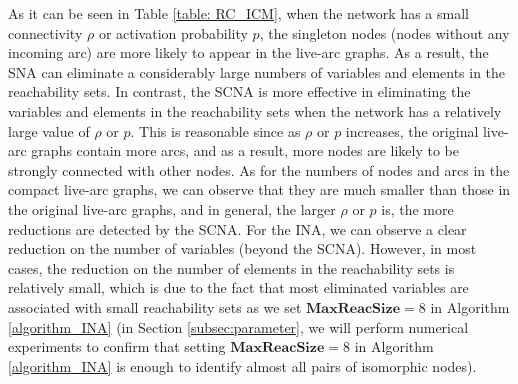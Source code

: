 \documentclass[a4paper,10pt]{article}
\newcommand{\maxlength}{\mathbf{MaxReacSize}}
\theoremstyle{plain}
\newcommand{\revv}[1]{{#1}}
\begin{document}
{	
	As it can be seen in Table \ref{table: RC_ICM}, when the network has a small \revv{connectivity} $\rho$ or activation probability $p$, the singleton nodes (nodes without any incoming arc) are more likely to appear in the live-arc graphs.
	As a result, the SNA can eliminate a considerably large numbers of variables and \revv{elements in the reachability sets}.
	In contrast, the SCNA is more effective in eliminating the variables and \revv{elements in the reachability sets} when the network has a relatively large value of $\rho$ or $p$.
	This is reasonable since as $\rho$ or $p$ increases, the original live-arc graphs contain more arcs, and as a result, \revv{more nodes are likely to be strongly connected with other nodes}.
	As for the numbers of nodes and arcs in the compact live-arc graphs, we can observe that they are much smaller than those in the original live-arc graphs, and \revv{in general}, the larger $\rho$ or $p$ is, the more reductions are detected by the SCNA.
	\revv{For the INA,
		we can observe a clear reduction on the number of variables (beyond the SCNA).}
	However, \revv{in most cases}, the reduction on the number of  \revv{elements in the reachability sets} is relatively small, which is due to the fact that most eliminated variables are associated with small reachability sets as we set $\maxlength=8$ in Algorithm \ref{algorithm_INA} (in \revv{Section} \ref{subsec:parameter}, we will perform numerical experiments to confirm that setting $\maxlength=8$ in Algorithm \ref{algorithm_INA} is enough to identify almost all pairs of isomorphic nodes).
	
	
	
}
\end{document}

